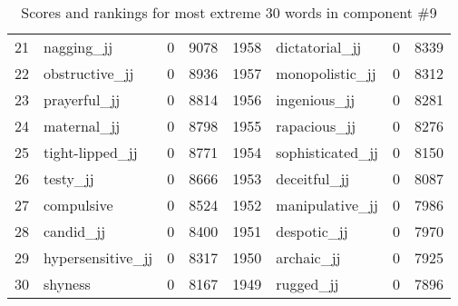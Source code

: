 \begin{table}[tbp]
\begin{tabular}{| rlr@{.}l | rlr@{.}l |}
    21 & nagging\_jj & 0 & 9078    &    1958 & dictatorial\_jj & 0 & 8339 \\
    22 & obstructive\_jj & 0 & 8936    &    1957 & monopolistic\_jj & 0 & 8312 \\
    23 & prayerful\_jj & 0 & 8814    &    1956 & ingenious\_jj & 0 & 8281 \\
    24 & maternal\_jj & 0 & 8798    &    1955 & rapacious\_jj & 0 & 8276 \\
    25 & tight-lipped\_jj & 0 & 8771    &    1954 & sophisticated\_jj & 0 & 8150 \\
    26 & testy\_jj & 0 & 8666    &    1953 & deceitful\_jj & 0 & 8087 \\
    27 & compulsive & 0 & 8524    &    1952 & manipulative\_jj & 0 & 7986 \\
    28 & candid\_jj & 0 & 8400    &    1951 & despotic\_jj & 0 & 7970 \\
    29 & hypersensitive\_jj & 0 & 8317    &    1950 & archaic\_jj & 0 & 7925 \\
    30 & shyness & 0 & 8167    &    1949 & rugged\_jj & 0 & 7896 \\
    \hline
    \end{tabular}
    \caption{Scores and rankings for most extreme 30 words in component \#9} 
\end{table}
\clearpage
